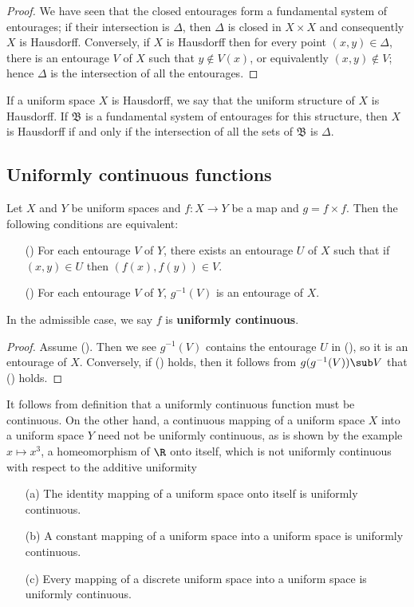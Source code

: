 \begin{proof}
We have seen that the closed entourages form a fundamental system of entourages; if their intersection is $\Delta$, then $\Delta$ is closed in $X\times X$ and consequently $X$ is Hausdorff. Conversely, if $X$ is Hausdorff then for every point $(x,y)\in\Delta$, there is an entourage $V$ of $X$ such that $y\notin V(x)$, or equivalently $(x,y)\notin V$; hence $\Delta$ is the intersection of all the entourages.
\end{proof}
If a uniform space $X$ is Hausdorff, we say that the uniform structure of $X$ is Hausdorff. If $\mathfrak{B}$ is a fundamental system of entourages for this structure, then $X$ is Hausdorff if and only if the intersection of all the sets of $\mathfrak{B}$ is $\Delta$.
\subsection{Uniformly continuous functions}
\begin{proposition}\label{uniformly continuous map iff}
Let $X$ and $Y$ be uniform spaces and $f:X\to Y$ be a map and $g=f\times f$. Then the following conditions are equivalent:
\begin{itemize}
\item[(\rmnum{1})] For each entourage $V$ of $Y$, there exists an entourage $U$ of $X$ such that if $(x,y)\in U$ then $(f(x),f(y))\in V$. 
\item[(\rmnum{2})] For each entourage $V$ of $Y$, $g^{-1}(V)$ is an entourage of $X$.
\end{itemize}
In the admissible case, we say $f$ is \textbf{uniformly continuous}.
\end{proposition}
\begin{proof}
Assume (). Then we see $g^{-1}(V)$ contains the entourage $U$ in (), so it is an entourage of $X$. Conversely, if () holds, then it follows from $g(g^{-1}(V))\sub V$ that () holds.
\end{proof}
It follows from definition that a uniformly continuous function must be continuous. On the other hand, a continuous mapping of a uniform space $X$ into a uniform space $Y$ need not be uniformly continuous, as is shown by the example $x\mapsto x^3$, a homeomorphism of $\R$ onto itself, which is not uniformly continuous with respect to the additive uniformity
\begin{example}
\mbox{}
\begin{itemize}
\item[(a)] The identity mapping of a uniform space onto itself is
uniformly continuous.
\item[(b)] A constant mapping of a uniform space into a uniform space is uniformly continuous.
\item[(c)] Every mapping of a discrete uniform space into a uniform space is uniformly continuous.
\end{itemize}
\end{example}
